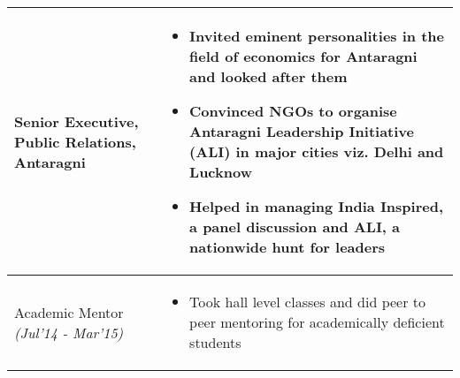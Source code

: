 \documentclass{article}
\begin{document}
\begin{tabular}{|P{3cm}|P{15.4cm}|}
\hline
\vspace{0.1cm}Senior Executive, Public Relations, Antaragni & \vspace{-0.4cm}\begin{itemize}[leftmargin=0.3cm]
\setlength\itemsep{0.2pt}
\item Invited eminent personalities in the field of economics for Antaragni and looked after them
\item Convinced NGOs to organise Antaragni Leadership Initiative (ALI) in major cities viz. Delhi and Lucknow
\item Helped in managing India Inspired, a panel discussion and ALI, a nationwide hunt for leaders

\end{itemize}\\
\hline
\vspace{-0.09cm}Academic Mentor {\emph{(Jul'14 - Mar'15)}} & \vspace{-0.4cm}\begin{itemize}[leftmargin=0.3cm]
\setlength\itemsep{0.2pt}
\item Took hall level classes and did peer to peer mentoring for academically deficient students
\end{itemize}\\
\hline
\end{tabular}\vspace{0.2cm}
\end{document}
